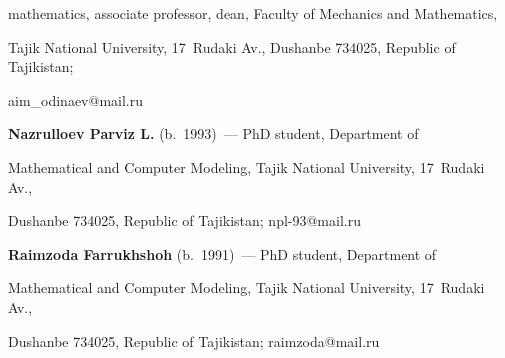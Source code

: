 mathematics, associate professor, dean, Faculty of Mechanics and Mathematics, 


Tajik National University, 17~Rudaki Av., Dushanbe 734025, Republic of Tajikistan; 


\mbox{aim\_odinaev@mail.ru}


  


  \vspace*{5pt}


  


  \noindent


  \textbf{Nazrulloev Parviz L.} (b.\ 1993)~--- PhD student, Department of 


Mathematical and Computer Modeling, Tajik National University, 17~Rudaki Av., 


Dushanbe 734025, Republic of Tajikistan; \mbox{npl-93@mail.ru}





  


  \vspace*{5pt}


  


  \noindent


  \textbf{Raimzoda Farrukhshoh} (b.\ 1991)~--- PhD student, Department of 


Mathematical and Computer Modeling, Tajik National University, 17~Rudaki Av., 


Dushanbe 734025, Republic of Tajikistan; \mbox{raimzoda@mail.ru}


  





\label{end\stat}





\renewcommand{\bibname}{\protect\rm Литература} 


